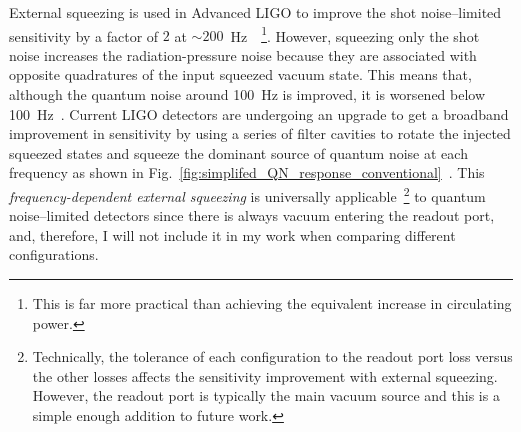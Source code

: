 External squeezing is used in Advanced LIGO to improve the shot noise--limited sensitivity by a factor of $2$ at $\sim200$~Hz~\cite{aasietal2013,tseQuantumEnhancedAdvancedLIGO2019}~\footnote{This is far more practical than achieving the equivalent increase in circulating power.}.
However, squeezing only the shot noise increases the radiation-pressure noise because they are associated with opposite quadratures of the input squeezed vacuum state. %
This means that, although the quantum noise around 100~Hz is improved, it is worsened below 100~Hz~\cite{aasietal2013}.
Current LIGO detectors are undergoing an upgrade to get a broadband improvement in sensitivity by using a series of filter cavities to rotate the injected squeezed states and squeeze the dominant source of quantum noise at each frequency as shown in Fig.~\ref{fig:simplifed_QN_response_conventional}~\cite{Ganapathy_2021}.
This \emph{frequency-dependent external squeezing} is universally applicable~\footnote{Technically, the tolerance of each configuration to the readout port loss versus the other losses affects the sensitivity improvement with external squeezing. However, the readout port is typically the main vacuum source and this is a simple enough addition to future work.} to quantum noise--limited detectors since there is always vacuum entering the readout port, and, therefore, I will not include it in my work when comparing different configurations. %


